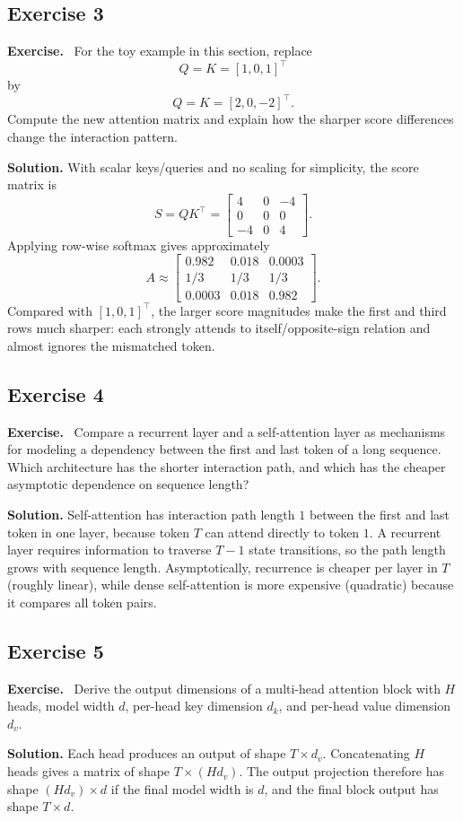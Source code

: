 \documentclass[11pt]{article}
\newenvironment{exercisebox}{\begin{framed}\noindent\textbf{Exercise.}\ }{\end{framed}}
\begin{document}
\subsection*{Exercise 3}
\begin{exercisebox}
For the toy example in this section, replace
    \[
    Q = K = [1,0,1]^{\top}
    \]
    by
    \[
    Q = K = [2,0,-2]^{\top}.
    \]
    Compute the new attention matrix and explain how the sharper score differences change the interaction pattern.
\end{exercisebox}
\textbf{Solution.} With scalar keys/queries and no scaling for simplicity, the score matrix is
\[
S=QK^\top=
\begin{bmatrix}
4&0&-4\\
0&0&0\\
-4&0&4
\end{bmatrix}.
\]
Applying row-wise softmax gives approximately
\[
A\approx
\begin{bmatrix}
0.982&0.018&0.0003\\
1/3&1/3&1/3\\
0.0003&0.018&0.982
\end{bmatrix}.
\]
Compared with $[1,0,1]^\top$, the larger score magnitudes make the first and third rows much sharper: each strongly attends to itself/opposite-sign relation and almost ignores the mismatched token.

\subsection*{Exercise 4}
\begin{exercisebox}
Compare a recurrent layer and a self-attention layer as mechanisms for modeling a dependency between the first and last token of a long sequence.
    Which architecture has the shorter interaction path, and which has the cheaper asymptotic dependence on sequence length?
\end{exercisebox}
\textbf{Solution.} Self-attention has interaction path length $1$ between the first and last token in one layer, because token $T$ can attend directly to token $1$. A recurrent layer requires information to traverse $T-1$ state transitions, so the path length grows with sequence length. Asymptotically, recurrence is cheaper per layer in $T$ (roughly linear), while dense self-attention is more expensive (quadratic) because it compares all token pairs.

\subsection*{Exercise 5}
\begin{exercisebox}
Derive the output dimensions of a multi-head attention block with \(H\) heads, model width \(d\), per-head key dimension \(d_k\), and per-head value dimension \(d_v\).
\end{exercisebox}
\textbf{Solution.} Each head produces an output of shape $T\times d_v$. Concatenating $H$ heads gives a matrix of shape $T\times (Hd_v)$. The output projection therefore has shape $(Hd_v)\times d$ if the final model width is $d$, and the final block output has shape $T\times d$.
\end{document}
